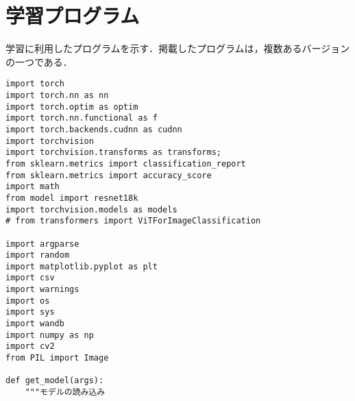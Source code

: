 \chapter{学習プログラム}
\label{学習プログラム}
学習に利用したプログラムを示す．掲載したプログラムは，複数あるバージョンの一つである．
{\tiny
\begin{verbatim}
import torch
import torch.nn as nn
import torch.optim as optim
import torch.nn.functional as f
import torch.backends.cudnn as cudnn
import torchvision
import torchvision.transforms as transforms;
from sklearn.metrics import classification_report
from sklearn.metrics import accuracy_score
import math
from model import resnet18k 
import torchvision.models as models
# from transformers import ViTForImageClassification

import argparse
import random
import matplotlib.pyplot as plt
import csv 
import warnings
import os
import sys
import wandb
import numpy as np
import cv2
from PIL import Image

def get_model(args):
    """モデルの読み込み


\end{verbatim}}
